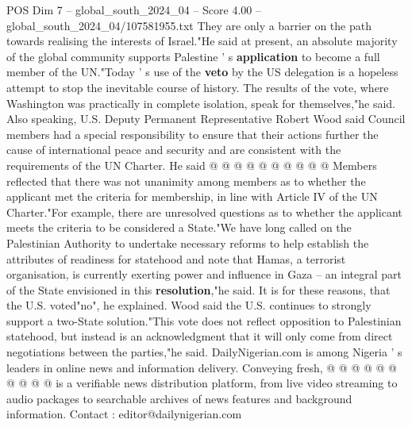 \begin{textsample}{POS Dim 7 – global\_south\_2024\_04 – Score 4.00 – global\_south\_2024\_04/107581955.txt}
They are only a barrier on the path towards realising the interests of Israel."He said at present, an absolute majority of the global community supports Palestine ' s \textbf{application} to become a full member of the UN."Today ' s use of the \textbf{veto} by the US delegation is a hopeless attempt to stop the inevitable course of history.
The results of the vote, where Washington was practically in complete isolation, speak for themselves,"he said.
Also speaking, U.S.
Deputy Permanent Representative Robert Wood said Council members had a special responsibility to ensure that their actions further the cause of international peace and security and are consistent with the requirements of the UN Charter.
He said @ @ @ @ @ @ @ @ @ @ Members reflected that there was not unanimity among members as to whether the applicant met the criteria for membership, in line with Article IV of the UN Charter."For example, there are unresolved questions as to whether the applicant meets the criteria to be considered a State."We have long called on the Palestinian Authority to undertake necessary reforms to help establish the attributes of readiness for statehood and note that Hamas, a terrorist organisation, is currently exerting power and influence in Gaza -- an integral part of the State envisioned in this \textbf{resolution},"he said.
It is for these reasons, that the U.S. voted"no", he explained.
Wood said the U.S. continues to strongly support a two-State solution."This vote does not reflect opposition to Palestinian statehood, but instead is an acknowledgment that it will only come from direct negotiations between the parties,"he said.
DailyNigerian.com is among Nigeria ' s leaders in online news and information delivery.
Conveying fresh, @ @ @ @ @ @ @ @ @ @ is a verifiable news distribution platform, from live video streaming to audio packages to searchable archives of news features and background information.
Contact : editor@dailynigerian.com

\end{textsample}
